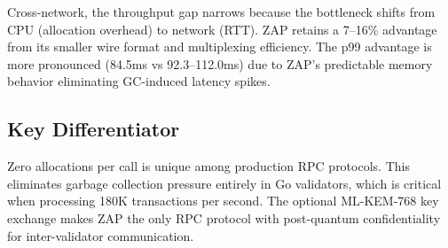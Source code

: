 Cross-network, the throughput gap narrows because the bottleneck shifts from CPU (allocation overhead) to network (RTT). ZAP retains a 7--16\% advantage from its smaller wire format and multiplexing efficiency. The p99 advantage is more pronounced (84.5ms vs 92.3--112.0ms) due to ZAP's predictable memory behavior eliminating GC-induced latency spikes.

\subsection{Key Differentiator}

Zero allocations per call is unique among production RPC protocols. This eliminates garbage collection pressure entirely in Go validators, which is critical when processing 180K transactions per second. The optional ML-KEM-768 key exchange makes ZAP the only RPC protocol with post-quantum confidentiality for inter-validator communication.

